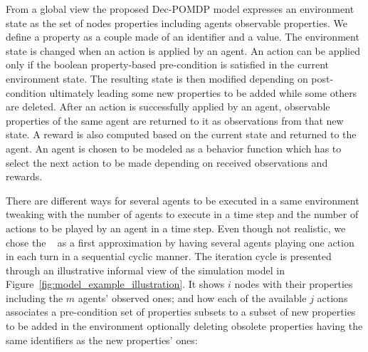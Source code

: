 \documentclass[conference]{IEEEtran}
\begin{document}
From a global view the proposed Dec-POMDP model expresses an environment state as the set of nodes properties including agents observable properties. We define a property as a couple made of an identifier and a value. The environment state is changed when an action is applied by an agent. An action can be applied only if the boolean property-based pre-condition is satisfied in the current environment state. The resulting state is then modified depending on post-condition ultimately leading some new properties to be added while some others are deleted. After an action is successfully applied by an agent, observable properties of the same agent are returned to it as observations from that new state. A reward is also computed based on the current state and returned to the agent. An agent is chosen to be modeled as a behavior function which has to select the next action to be made depending on received observations and rewards.

There are different ways for several agents to be executed in a same environment tweaking with the number of agents to execute in a time step and the number of actions to be played by an agent in a time step. Even though not realistic, we chose the ~\cite{jk2020} as a first approximation by having several agents playing one action in each turn in a sequential cyclic manner. The iteration cycle is presented through an illustrative informal view of the simulation model in Figure~\ref{fig:model_example_illustration}. It shows $i$ nodes with their properties including the $m$ agents' observed ones; and how each of the available $j$ actions associates a pre-condition set of properties subsets to a subset of new properties to be added in the environment optionally deleting obsolete properties having the same identifiers as the new properties' ones:
\end{document}
